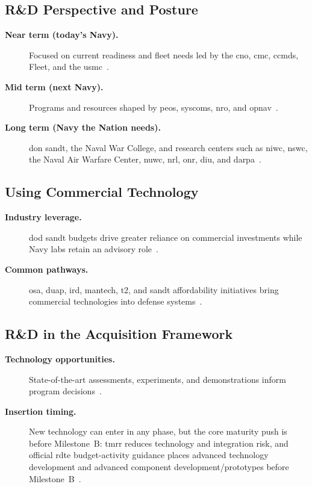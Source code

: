 \documentclass[../main.tex]{subfiles}
\begin{document}
\subsection{R\&D Perspective and Posture}
\begin{description}
  \item[\textbf{Near term (today's Navy).}] Focused on current readiness and fleet needs led by the \ac{cno}, \ac{cmc}, \acp{ccmd}, Fleet, and the \ac{usmc}~\autocite{edo-3-3-4-research-development-2025}.
  \item[\textbf{Mid term (next Navy).}] Programs and resources shaped by \acp{peo}, \acp{syscom}, \ac{nro}, and \ac{opnav}~\autocite{edo-3-3-4-research-development-2025}.
  \item[\textbf{Long term (Navy the Nation needs).}] \ac{don} \ac{sandt}, the Naval War College, and research centers such as \ac{niwc}, \ac{nswc}, the Naval Air Warfare Center, \ac{nuwc}, \ac{nrl}, \ac{onr}, \ac{diu}, and \ac{darpa}~\autocite{edo-3-3-4-research-development-2025}.
\end{description}

\subsection{Using Commercial Technology}
\begin{description}
  \item[\textbf{Industry leverage.}] \ac{dod} \ac{sandt} budgets drive greater reliance on commercial investments while Navy labs retain an advisory role~\autocite{edo-3-3-4-research-development-2025}.
  \item[\textbf{Common pathways.}] \ac{osa}, \ac{duap}, \ac{ird}, \ac{mantech}, \ac{t2}, and \ac{sandt} affordability initiatives bring commercial technologies into defense systems~\autocite{edo-3-3-4-research-development-2025}.
\end{description}

\subsection{R\&D in the Acquisition Framework}
\begin{description}
  \item[\textbf{Technology opportunities.}] State-of-the-art assessments, experiments, and demonstrations inform program decisions~\autocite{edo-3-3-4-research-development-2025}.
  \item[\textbf{Insertion timing.}] New technology can enter in any phase, but the core maturity push is before Milestone~B: \ac{tmrr} reduces technology and integration risk, and official \ac{rdte} budget-activity guidance places advanced technology development and advanced component development/prototypes before Milestone~B~\autocite{edo-3-3-4-research-development-2025,DoDI5000-85,DoDFMR-Vol2B-Ch5,USDRE-TRA-2025}.
\end{description}
\end{document}
